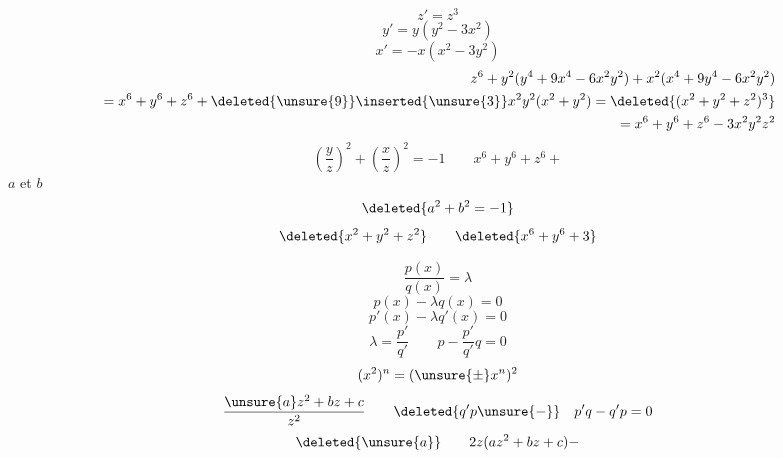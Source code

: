 \[
z'=z^3
\]
\[
y'=y(y^2-3x^2)
\]
\[
x'=-x(x^2-3y^2)
\]
\[
\begin{aligned}
z^6+y^2(y^4+9x^4-6x^2y^2)+x^2(x^4+9y^4-6x^2y^2)\\
{}=x^6+y^6+z^6+\deleted{\unsure{9}}\inserted{\unsure{3}}x^2y^2(x^2+y^2)
=\deleted{(x^2+y^2+z^2)^3}\\
{}=x^6+y^6+z^6-3x^2y^2z^2
\end{aligned}
\]
\[
\left(\frac yz\right)^2+\left(\frac xz\right)^2=-1
\qquad x^6+y^6+z^6+
\]
$a$ et $b$
\[
\deleted{a^2+b^2=-1}
\]
\[
\deleted{x^2+y^2+z^2}\qquad\deleted{x^6+y^6+3}
\]

\[
\frac{p(x)}{q(x)}=\lambda
\]
\[
p(x)-\lambda q(x)=0
\]
\[
p'(x)-\lambda q'(x)=0
\]
\[
\lambda=\frac{p'}{q'}\qquad p-\frac{p'}{q'}q=0
\]
\[
(x^2)^n=(\unsure{\pm}x^n)^2
\]
\[
\frac{\unsure{a}z^2+bz+c}{z^2}\qquad
\deleted{q'p\unsure{-}}\quad p'q-q'p=0
\]
\[
\deleted{\unsure{a}}\qquad 2z(az^2+bz+c)-
\]
